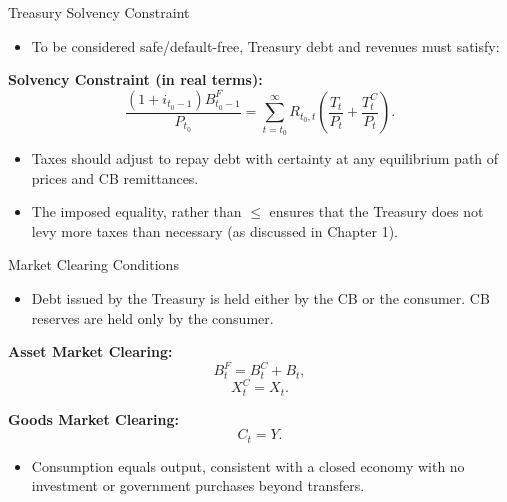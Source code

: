 \documentclass[11pt,aspectratio=169]{beamer}
\begin{document}
\begin{frame}{Treasury Solvency Constraint}
\small
\begin{itemize}
    \item To be considered safe/default-free, Treasury debt and revenues must satisfy:
\end{itemize}
\noindent\textbf{Solvency Constraint (in real terms):} 
    \begin{equation}
    \frac{(1+i_{t_0-1})B_{t_0-1}^{F}}{P_{t_0}} = \sum_{t=t_0}^{\infty} R_{t_0,t}\left(\frac{T_t}{P_t} + \frac{T_t^C}{P_t}\right).
    \label{treasury_solv}
    \end{equation}
    
\begin{itemize}    
\item Taxes should adjust to repay debt with certainty at any equilibrium path of prices and CB remittances.
    \item The imposed equality, rather than $\leq$ ensures that the Treasury does not levy more taxes than necessary (as discussed in Chapter 1).
\end{itemize}
\end{frame}

\begin{frame}{Market Clearing Conditions}
\begin{itemize}
    \item Debt issued by the Treasury is held either by the CB or the consumer.  
          CB reserves are held only by the consumer.
\end{itemize}

\vspace{0.25cm}
\noindent\textbf{Asset Market Clearing:}
\begin{equation}
B_t^F = B_t^C + B_t,
\label{eq: Bonds-CBDC}
\end{equation}
\begin{equation}
X_t^C = X_t.
\label{eq: reserves-CBDC}
\end{equation}

\vspace{0.25cm}
\noindent\textbf{Goods Market Clearing:}
\[
C_t = Y.
\]

\begin{itemize}
    \item Consumption equals output, consistent with a closed economy with no investment or government purchases beyond transfers.
\end{itemize}
\end{frame}
\end{document}
